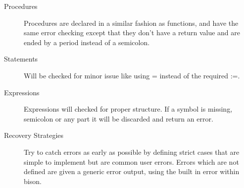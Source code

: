 \documentclass{article}
\begin{document}
\begin{description}
\item[Procedures]
	Procedures are declared in a similar fashion as functions, and have the same
	error checking except that they don't have a return value and are ended by 
	a period instead of a semicolon. 

\item[Statements]
	Will be checked for minor issue like using = instead of the required :=.

\item[Expressions]
	Expressions will checked for proper structure. If a symbol is missing,
	semicolon or any part it will be discarded and return an error. 
	
\item[Recovery Strategies]
	Try to catch errors as early as possible by defining strict cases that are
	simple to implement but are common user errors. Errors which are not defined
	are given a generic error output, using the built in error within bison.

\end{description}
\end{document}
